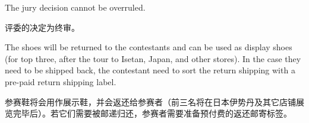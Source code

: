 \begin{paracol}{2}
        The jury decision cannot be overruled.

        \vspace{1em}

        \switchcolumn
        评委的决定为终审。
        \switchcolumn*

        The shoes will be returned to the contestants and can be used as display shoes (for top three, after the tour to Isetan, Japan, and other stores). In the case they need to be shipped back, the contestant need to sort the return shipping with a pre-paid return shipping label.

        \switchcolumn
        参赛鞋将会用作展示鞋，并会返还给参赛者（前三名将在日本伊势丹及其它店铺展览完毕后）。若它们需要被邮递归还，参赛者需要准备预付费的返还邮寄标签。
        \switchcolumn*

    \egroup

\end{paracol}

\theendnotes

